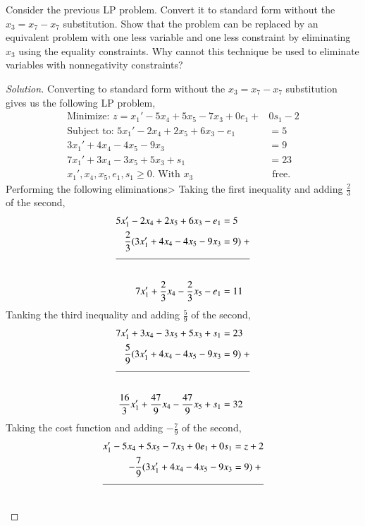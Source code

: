 \documentclass[12pt]{article}
\makeatletter
\theoremstyle{homework}
\newenvironment{exercise}[1]
{\def\@currentlabel{#1}\exercisecore}
{\endexercisecore}
\makeatother
\begin{document}
\begin{exercise}{2.4} Consider the previous LP problem. Convert it to standard form 
  without the $x_3 = x_7 - x_7$ substitution. Show that the problem can be replaced 
  by an equivalent problem with one less variable and one less constraint by eliminating $x_3$
  using the equality constraints. Why cannot this technique be used to eliminate variables with
  nonnegativity constraints? 
  \begin{proof}[Solution] Converting to standard form without the $x_3 = x_7 - x_7$ substitution gives 
    us the following LP problem, 
    \begin{align*}
      \text{Minimize: } z = x_1' - 5x_4 + 5x_5 - 7x_3 + 0e_1 + &0s_1 - 2\\
      \text{Subject to: } 5x_1' - 2x_4 + 2x_5 + 6x_3 - e_1 &= 5\\
      3x_1'  + 4x_4 - 4x_5 -9x_3  &=  9\\
      7x_1'  +3x_4 - 3x_5 +5x_3 + s_1  &= 23\\
      x_1', x_4, x_5, e_1, s_1 \geq 0.  \text{ With } x_3 &\text{ free}.
    \end{align*}
    Performing the following eliminations> 
    Taking the first inequality and adding $\frac{2}{3}$ of the second, 
    \begin{align*}
      5x_1' - 2x_4 + 2x_5 + 6x_3 - e_1 &= 5\\
      \dfrac{2}{3}(3x_1'  + 4x_4 - 4x_5 -9x_3 &=  9)\text{   } +\\
      \cline{1-2}\\
      7x_1' + \frac{2}{3}x_4 - \frac{2}{3}x_5 - e_1 &= 11
    \end{align*}
    Tanking the third inequality and adding $\frac{5}{9}$ of the second, 
    \begin{align*}
      7x_1' + 3x_4 - 3x_5 + 5x_3 + s_1 &= 23\\
      \dfrac{5}{9}(3x_1'  + 4x_4 - 4x_5 -9x_3 &=  9)\text{   } +\\
      \cline{1-2}\\
      \dfrac{16}{3}x_1' + \dfrac{47}{9}x_4 - \dfrac{47}{9}x_5 + s_1 &= 32
    \end{align*}
    Taking the cost function and adding $-\frac{7}{9}$ of the second, 
    \begin{align*}
      x_1' - 5x_4 + 5x_5 - 7x_3 + 0e_1 + 0s_1 &= z + 2\\
      -\dfrac{7}{9}(3x_1'  + 4x_4 - 4x_5 -9x_3 &=  9)\text{   } +\\
      \cline{1-2}\\

\end{align*}
\end{proof}
\end{exercise}
\end{document}
